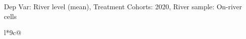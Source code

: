 \begin{table}[H]
\captionlistentry[table]{}
\label{table:beaver_hydrometry_DVlevel_mean_SCg3}
\tiny %
Dep Var: River level (mean), Treatment Cohorts: 2020, River sample: On-river cells \\
\begin{threeparttable}
\begin{tabulary}{\textwidth}{l*{9}{c}@{}}
\toprule \toprule
\noalign{\smallskip}
\noalign{\smallskip}
\midrule \bottomrule
\end{tabulary}
\medskip
\end{threeparttable}
\end{table}

